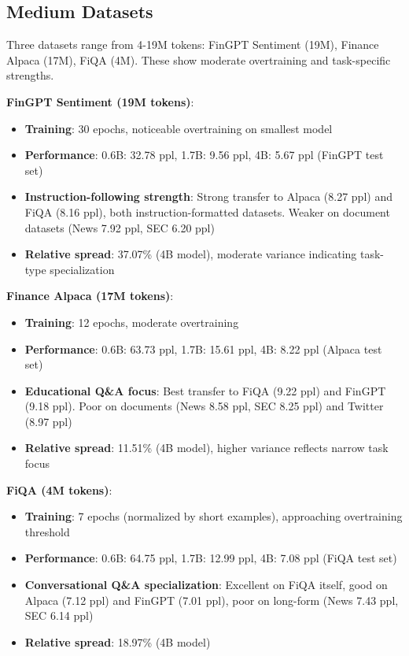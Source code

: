 



\subsection{Medium Datasets}

Three datasets range from 4-19M tokens: FinGPT Sentiment (19M), Finance Alpaca (17M), FiQA (4M). These show moderate overtraining and task-specific strengths.

\textbf{FinGPT Sentiment (19M tokens)}:
\begin{itemize}
\item \textbf{Training}: 30 epochs, noticeable overtraining on smallest model
\item \textbf{Performance}: 0.6B: 32.78 ppl, 1.7B: 9.56 ppl, 4B: 5.67 ppl (FinGPT test set)
\item \textbf{Instruction-following strength}: Strong transfer to Alpaca (8.27 ppl) and FiQA (8.16 ppl), both instruction-formatted datasets. Weaker on document datasets (News 7.92 ppl, SEC 6.20 ppl)
\item \textbf{Relative spread}: 37.07\% (4B model), moderate variance indicating task-type specialization
\end{itemize}

\textbf{Finance Alpaca (17M tokens)}:
\begin{itemize}
\item \textbf{Training}: 12 epochs, moderate overtraining
\item \textbf{Performance}: 0.6B: 63.73 ppl, 1.7B: 15.61 ppl, 4B: 8.22 ppl (Alpaca test set)
\item \textbf{Educational Q\&A focus}: Best transfer to FiQA (9.22 ppl) and FinGPT (9.18 ppl). Poor on documents (News 8.58 ppl, SEC 8.25 ppl) and Twitter (8.97 ppl)
\item \textbf{Relative spread}: 11.51\% (4B model), higher variance reflects narrow task focus
\end{itemize}

\textbf{FiQA (4M tokens)}:
\begin{itemize}
\item \textbf{Training}: 7 epochs (normalized by short examples), approaching overtraining threshold
\item \textbf{Performance}: 0.6B: 64.75 ppl, 1.7B: 12.99 ppl, 4B: 7.08 ppl (FiQA test set)
\item \textbf{Conversational Q\&A specialization}: Excellent on FiQA itself, good on Alpaca (7.12 ppl) and FinGPT (7.01 ppl), poor on long-form (News 7.43 ppl, SEC 6.14 ppl)
\item \textbf{Relative spread}: 18.97\% (4B model)
\end{itemize}

